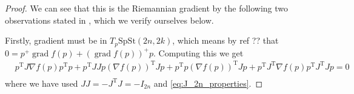 \begin{proof}
    We can see that this is the Riemannian gradient by the following two observations stated in \cite{BZ}, which we verify ourselves below.

    Firstly, gradient must be in $T_{p}\mathrm{SpSt}(2n, 2k)$, which means by ref ?? that $0=p^{+}\operatorname{grad}f(p)+(\operatorname{grad}f(p))^{+}p$. Computing this we get 
    \begin{equation}
        \begin{split}
        &p^{\mathrm{T}}J\nabla f(p)p^{\mathrm{T}}p+p^{\mathrm{T}}JJp(\nabla f(p))^{\mathrm{T}}Jp+p^{\mathrm{T}}p(\nabla f(p))^{\mathrm{T}}Jp+p^{\mathrm{T}}J^{\mathrm{T}}\nabla f(p)p^{\mathrm{T}}J^{\mathrm{T}}Jp=0\\
        \end{split}
    \end{equation}
    where we have used $JJ=-J^{\mathrm{T}}J=-I_{2n}$ and \eqref{eq:J_2n_properties}.
    

\end{proof}
